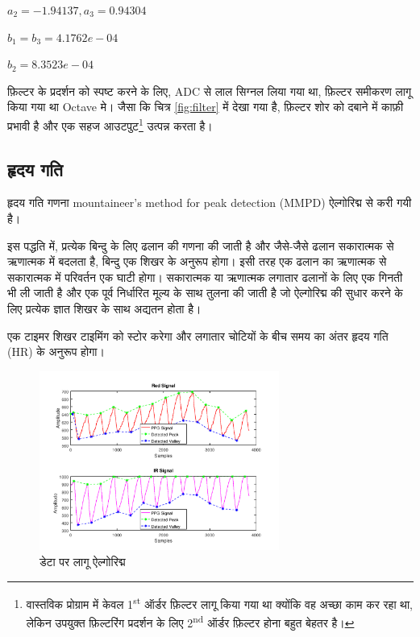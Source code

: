 		$a_2 = -1.94137, a_3 = 0.94304$
		
		$b_1 = b_3 = 4.1762e-04$
		
		$b_2 = 8.3523e-04$	
		
		फ़िल्टर के प्रदर्शन को स्पष्ट करने के लिए, ADC से लाल सिग्नल लिया गया था, फ़िल्टर समीकरण लागू किया गया था Octave मे। जैसा कि चित्र \ref{fig:filter} में देखा गया है, फ़िल्टर शोर को दबाने में काफ़ी प्रभावी है और एक सहज आउटपुट\footnote{वास्तविक प्रोग्राम में केवल 1\textsuperscript{st} ऑर्डर फ़िल्टर लागू किया गया था क्योंकि वह अच्छा काम कर रहा था, लेकिन उपयुक्त फ़िल्टरिंग प्रदर्शन के लिए 2\textsuperscript{nd} ऑर्डर फ़िल्टर होना बहुत बेहतर है।} उत्पन्न करता है।
		
	
	\subsection{हृदय गति}
	
		हृदय गति गणना mountaineer's method for peak detection (MMPD)\cite{mmpd} ऐल्गोरिद्म से करी गयी है। 
		
		इस पद्धति में, प्रत्येक बिन्दु के लिए ढलान की गणना की जाती है और जैसे-जैसे ढलान सकारात्मक से ऋणात्मक में बदलता है, बिन्दु एक शिखर के अनुरूप होगा। इसी तरह एक ढलान का ऋणात्मक से सकारात्मक में परिवर्तन एक घाटी होगा। सकारात्मक या ऋणात्मक लगातार ढलानों के लिए एक गिनती भी ली जाती है और एक पूर्व निर्धारित मूल्य के साथ तुलना की जाती है जो ऐल्गोरिद्म की सुधार करने के लिए प्रत्येक ज्ञात शिखर के साथ अद्यतन होता है।
		
		एक टाइमर शिखर टाइमिंग को स्टोर करेगा और लगातार चोटियों के बीच समय का अंतर हृदय गति (HR) के अनुरूप होगा।
		
		\begin{figure}[ht!]
			\centering
			\includegraphics[width=0.7\textwidth]{../common/algo/mmpd.png}
			\caption{डेटा पर लागू ऐल्गोरिद्म}
		\end{figure}
	
